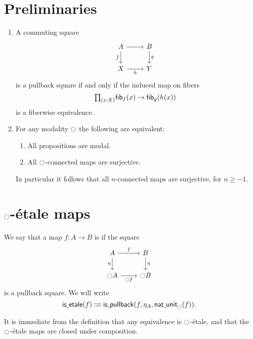 \documentclass[9pt,twosided]{amsart}
\begin{document}
\section{Preliminaries}
\begin{enumerate}
\item A commuting square
\begin{equation*}
\begin{tikzcd}
A \arrow[d,swap,"f"] \arrow[r] & B \arrow[d,"g"] \\
X \arrow[r,swap,"h"] & Y
\end{tikzcd}
\end{equation*}
is a pullback square if and only if the induced map on fibers
\begin{equation*}
\prd{x:X}\fib{f}{x}\to\fib{g}{h(x)}
\end{equation*}
is a fiberwise equivalence.
\item For any modality ${\ocircle}$ the following are equivalent:
\begin{enumerate}
\item All propositions are modal.
\item All ${\ocircle}$-connected maps are surjective.
\end{enumerate}
In particular it follows that all $n$-connected maps are surjective, for $n\geq -1$.
\end{enumerate}

\section{\texorpdfstring{${\ocircle}$}{○}-\'etale maps}

\begin{defn}
We say that a map $f:A\to B$ is  if the square
\begin{equation*}
\begin{tikzcd}
A \arrow[r,"f"] \arrow[d,swap,"\eta"] & B \arrow[d,"\eta"] \\
\modal A \arrow[r,swap,"\modal f"] & \modal B
\end{tikzcd}
\end{equation*}
is a pullback square. We will write
\begin{equation*}
\mathsf{is\underline{\ }{}etale}(f)\vcentcolon\equiv\mathsf{is\underline{\ }{}pullback}(f,\eta_A,\mathsf{nat\underline{\ }{}unit}_{\ocircle}(f)).
\end{equation*}
\end{defn}

It is immediate from the definition that any equivalence is ${\ocircle}$-\'etale, and that the ${\ocircle}$-\'etale maps are closed under composition.
\end{document}
